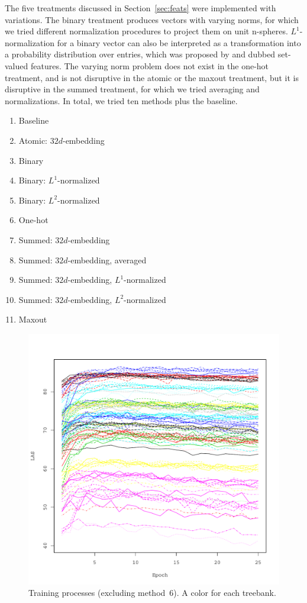 \documentclass[11pt]{article}
\begin{document}
The five treatments discussed in Section~\ref{sec:feats} were implemented with variations.
The binary treatment produces vectors with varying norms,
for which we tried different normalization procedures to project them on unit n-spheres.
\(L^{1}\)-normalization for a binary vector can also be interpreted as a transformation into a probability distribution over entries,
which was proposed by \textcite{alberti2015improved} and dubbed set-valued features.
The varying norm problem does not exist in the one-hot treatment,
and is not disruptive in the atomic or the maxout treatment,
but it is disruptive in the summed treatment,
for which we tried averaging and normalizations.
In total, we tried ten methods plus the baseline.

\begin{enumerate}
  \ttfamily
  \setcounter{enumi}{-1}
\item Baseline
\item Atomic: \(32d\)-embedding
\item Binary
\item Binary: \(L^{1}\)-normalized
\item Binary: \(L^{2}\)-normalized
\item One-hot
\item Summed: \(32d\)-embedding
\item Summed: \(32d\)-embedding, averaged
\item Summed: \(32d\)-embedding, \(L^{1}\)-normalized
\item Summed: \(32d\)-embedding, \(L^{2}\)-normalized
\item Maxout
\end{enumerate}

\begin{figure}[htb!]
  \centering
  \includegraphics[width=\textwidth,page=1]{bachelor_thesis_plots.pdf}
  \caption[]{\label{fig:score:method}Training processes (excluding method~6). A color for each treebank.}
\end{figure}
\end{document}
